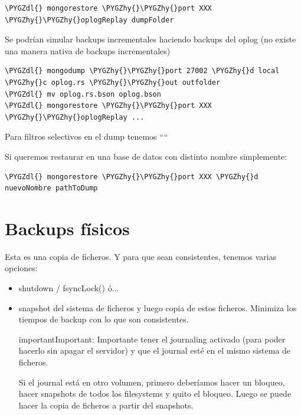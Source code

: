 \documentclass[a4paper,10pt,english]{sphinxmanual}
\def\PYGZdl{\char`\$}
\def\PYGZhy{\char`\-}
\begin{document}
\begin{Verbatim}[commandchars=\\\{\}]
\PYGZdl{} mongorestore \PYGZhy{}\PYGZhy{}port XXX \PYGZhy{}\PYGZhy{}oplogReplay dumpFolder
\end{Verbatim}

Se podrían simular backups incrementales haciendo backups del oplog (no existe una manera nativa de backups incrementales)

\begin{Verbatim}[commandchars=\\\{\}]
\PYGZdl{} mongodump \PYGZhy{}\PYGZhy{}port 27002 \PYGZhy{}d local \PYGZhy{}c oplog.rs \PYGZhy{}\PYGZhy{}out outfolder
\PYGZdl{} mv oplog.rs.bson oplog.bson
\PYGZdl{} mongorestore \PYGZhy{}\PYGZhy{}port XXX \PYGZhy{}\PYGZhy{}oplogReplay ...
\end{Verbatim}

Para filtros selectivos en el dump tenemos ````

Si queremos restaurar en una base de datos con distinto nombre simplemente:

\begin{Verbatim}[commandchars=\\\{\}]
\PYGZdl{} mongorestore \PYGZhy{}\PYGZhy{}port XXX \PYGZhy{}d nuevoNombre pathToDump
\end{Verbatim}


\section{Backups físicos}
\label{contents/backups:backups-fisicos}
Esta es una copia de ficheros. Y para que sean consistentes, tenemos varias opciones:
\begin{itemize}
\item {} 
shutdown / fsyncLock() ó...

\item {} 
snapshot del sistema de ficheros y luego copia de estos ficheros. Minimiza los tiempos de backup con lo que son consistentes.

\begin{notice}{important}{Important:}
Importante tener el journaling activado (para poder hacerlo sin apagar el servidor) y que el journal esté en el mismo sistema de ficheros.

Si el journal está en otro volumen, primero deberíamos hacer un bloqueo, hacer snapshots de todos los filesystems y quito el bloqueo. Luego se puede hacer la copia de ficheros a partir del snapshots.
\end{notice}

\end{itemize}
\end{document}
